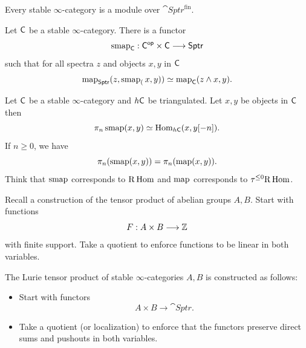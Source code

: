 \begin{theorem}
	Every stable $\infty$-category is a module over $\cat{Sptr}^{\text{fin}}$.
\end{theorem}
\begin{theorem}[Lurie]
	Let $\mathsf{C}$ be a stable $\infty$-category. There is a functor
	\[
		\smap_\C : \C\op\times \C\to \cat{Sptr}
	\]
	such that for all spectra $z$ and objects $x,y$ in $\mathsf{C}$
	\[
		\operatorname{map}_{\mathsf{Sptr}}(z,\operatorname{smap}_(x,y)) \simeq \operatorname{map}_\mathsf{C}(z\wedge x, y).
	\]
\end{theorem}
Let $\mathsf{C}$ be a stable $\infty$-category and $h\mathsf{C}$ be triangulated. Let $x,y$ be objects in $\mathsf{C}$ then
\[
	\pi_n\operatorname{smap}(x,y) \simeq \operatorname{Hom}_{h\mathsf{C}}(x,y[-n]).
\]
If $n\ge 0$, we have
\[
	\pi_n(\operatorname{smap}(x,y)) = \pi_n(\operatorname{map}(x,y)).
\]
Think that $\operatorname{smap} $ corresponds to $\mathrm{R}\operatorname{Hom}$ and $\operatorname{map}$ corresponds to $\tau^{\le 0}\mathrm{R}\operatorname{Hom}$.

Recall a construction of the tensor product of abelian groups $A,B$. Start with functions
\[
	F:A\times B\to \Z
\]
with finite support. Take a quotient to enforce functions to be linear in both variables.

The Lurie tensor product of stable $\infty$-categories $A,B$ is constructed as follows:
\begin{itemize}
	\item Start with functors
		\[
			A\times B\to \cat{Sptr}.
		\]
	\item Take a quotient (or localization) to enforce that the functors preserve direct
		sums and pushouts in both variables.
\end{itemize}


